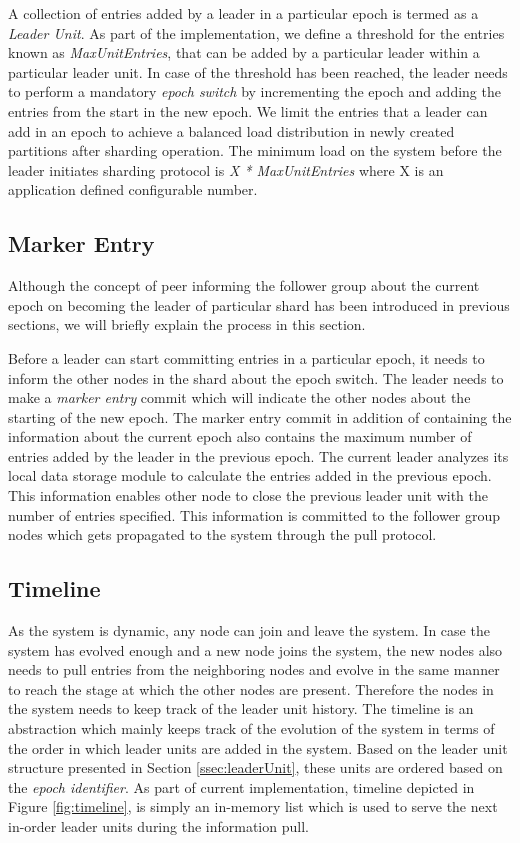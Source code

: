 \documentclass[a4paper,11pt]{kth-mag}
\begin{document}
A collection of entries added by a leader in a particular epoch is termed as a \textit{Leader Unit}. As part of the implementation, we define a threshold for the entries known as \textit{MaxUnitEntries}, that can be added by a particular leader within a particular leader unit.  In case of the threshold has been reached, the leader needs to perform a mandatory \textit{epoch switch} by incrementing the epoch and adding the entries from the start in the new epoch. We limit the entries that a leader can add in an epoch to achieve a balanced load distribution in newly created partitions after sharding operation. The minimum load on the system before the leader initiates sharding protocol is \textit{ X * MaxUnitEntries} where X is an application defined configurable number.



\subsection{Marker Entry}

Although the concept of peer informing the follower group about the current epoch on becoming the leader of particular shard has been introduced in previous sections, we will briefly explain the process in this section.

\par Before a leader can start committing entries in a particular epoch, it needs to inform the other nodes in the shard about the epoch switch. The leader needs to make a \textit{marker entry} commit which will indicate the other nodes about the starting of the new epoch. The marker entry commit in addition of containing the information about the current epoch also contains the maximum number of entries added by the leader in the previous epoch. The current leader analyzes its local data storage module to calculate the entries added in the previous epoch. This information enables other node to close the previous leader unit with the number of entries specified. This information is committed to the follower group nodes which gets propagated to the system through the pull protocol.

\subsection{Timeline}
\label{ssec:timeline}

As the system is dynamic, any node can join and leave the system. In case the system has evolved enough and a new node joins the system, the new nodes also needs to pull entries from the neighboring nodes and evolve in the same manner to reach the stage at which the other nodes are present. Therefore the nodes in the system needs to keep track of the leader unit history. The timeline is an abstraction which mainly keeps track of the evolution of the system in terms of the order in which leader units are added in the system. Based on the leader unit structure presented in Section \ref{ssec:leaderUnit}, these units are ordered based on the \textit{epoch identifier}. As part of current implementation, timeline depicted in Figure \ref{fig:timeline}, is simply an in-memory list which is used to serve the next in-order leader units during the information pull.
\end{document}
